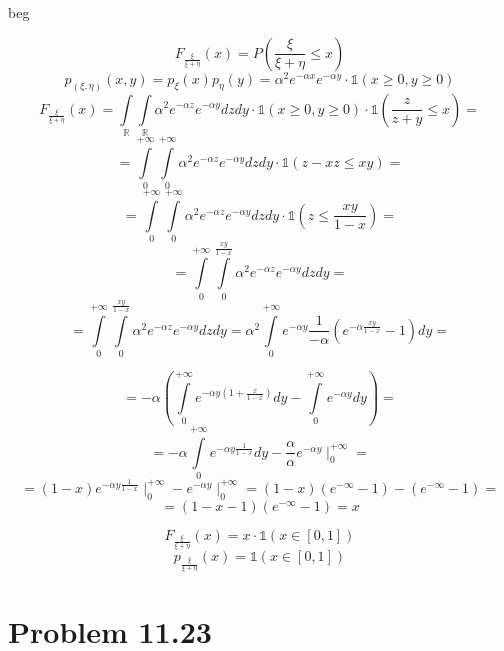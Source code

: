 \documentclass[12pt,letterpaper]{article}
\begin{document}
\noindent{}
beg

\[ F_{\frac{\xi}{\xi + \eta}}(x) = P(\frac{\xi}{\xi + \eta} \leq x) \]
\[ p_{(\xi, \eta)}(x, y) = p_{\xi}(x) p_{\eta}(y) = \alpha^2 e^{-\alpha x} e^{-\alpha y} \cdot \mathds{1}(x \geq 0, y \geq 0) \]
\[ F_{\frac{\xi}{\xi + \eta}}(x) = \int\limits_{\mathbb{R}}\int\limits_{\mathbb{R}}
    \alpha^2 e^{-\alpha z} e^{-\alpha y} dz dy \cdot
    \mathds{1}(x \geq 0, y \geq 0) \cdot \mathds{1}\left(\frac{z}{z + y} \leq x\right) = \]
\[ = \int\limits_0^{+\infty}\int\limits_0^{+\infty}
    \alpha^2 e^{-\alpha z} e^{-\alpha y} dz dy \cdot
    \mathds{1}(z - xz \leq xy) = \]
\[ = \int\limits_{0}^{+\infty}\int\limits_0^{+\infty}
    \alpha^2 e^{-\alpha z} e^{-\alpha y} dz dy \cdot
    \mathds{1}\left(z \leq \frac{xy}{1 - x}\right) = \]
\[ = \int\limits_{0}^{+\infty}\int\limits_0^{\frac{xy}{1 - x}}
    \alpha^2 e^{-\alpha z} e^{-\alpha y} dz dy = \] 
\[ = \int\limits_{0}^{+\infty}\int\limits_0^{\frac{xy}{1 - x}}
     \alpha^2 e^{-\alpha z} e^{-\alpha y} dz dy =
   \alpha^2 \int\limits_{0}^{+\infty} 
   e^{-\alpha y} \frac{1}{-\alpha} \left( e^{-\alpha \frac{xy}{1-x}} - 1 \right) dy = \] 

   \[ = -\alpha \left( \int\limits_0^{+\infty} e^{-\alpha y (1 + \frac{x}{1-x}) } dy -
       \int\limits_0^{+\infty} e^{-\alpha y} dy \right) = \]
   \[ = -\alpha \int\limits_0^{+\infty} e^{-\alpha y \frac{1}{1-x} } dy -
       \frac{\alpha}{\alpha} e^{-\alpha y}\mid_{0}^{+\infty}  = \]
   \[ = (1-x) e^{-\alpha y \frac{1}{1-x} } \mid_0^{+\infty} -
   e^{-\alpha y}\mid_{0}^{+\infty} = (1-x)(e^{-\infty} - 1) - (e ^ {-\infty} - 1) = \]
   \[ = (1 - x - 1)(e ^ {-\infty} - 1) = x \]

   \[ F_{\frac{\xi}{\xi + \eta}}(x) = x \cdot \mathds{1}(x \in [0, 1]) \]
   \[ p_{\frac{\xi}{\xi + \eta}}(x) = \mathds{1}(x \in [0, 1]) \]

\section*{Problem 11.23}

\noindent{}
\end{document}
